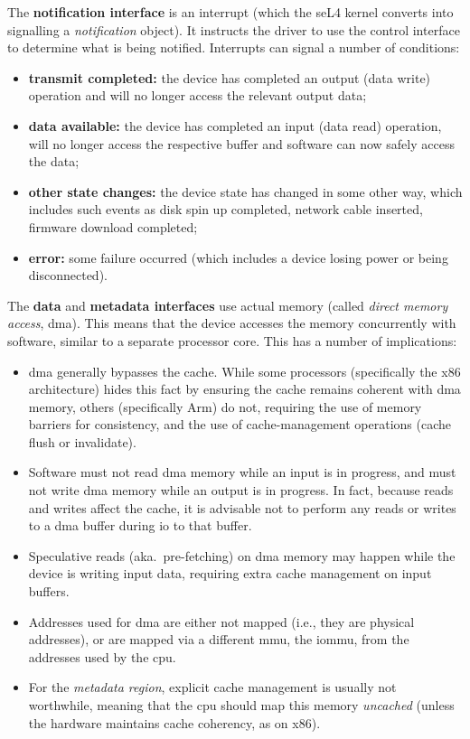 \documentclass[a4paper,12pt]{report}
\newcommand{\Obj}[1]{\textsl{#1}}
\begin{document}
The \textbf{notification interface} is an interrupt (which the seL4 kernel
converts into signalling a \Obj{notification} object). It instructs
the driver to use the control interface to determine
what is being notified. Interrupts can signal a number of conditions:
\begin{itemize}
\item \textbf{transmit completed:} the device has completed an output (data
  write) operation and will no longer access the relevant output data;
\item \textbf{data available:} the device has completed an input (data read)
  operation, will no longer access the respective buffer and software
  can now safely access the data;
\item \textbf{other state changes:} the device state has changed in
  some other way, which includes such events as disk spin up
  completed, network cable inserted, firmware download completed;
\item \textbf{error:} some failure occurred (which includes a device losing
  power or being disconnected).
\end{itemize}

The \textbf{data} and \textbf{metadata interfaces} use
actual memory (called \emph{direct memory access},
\gls{dma}). This means that the device accesses the memory concurrently with software, similar to a separate
processor core. This has a number of implications:
\begin{itemize}
\item \gls{dma} generally bypasses the cache. While some processors (specifically the
  x86 architecture) hides this fact by ensuring the cache remains
  coherent with \gls{dma} memory, others (specifically Arm) do not,
  requiring the use of memory barriers for consistency, and the use of
  cache-management operations (cache flush or invalidate).
\item Software must not read \gls{dma} memory while an input is in progress,
  and must not write \gls{dma} memory while an output is in progress.  In
  fact, because reads and writes affect the cache, it is advisable not
  to perform any reads or writes to a \gls{dma} buffer during \gls{io} to that
  buffer.
\item Speculative reads (aka.\ pre-fetching) on \gls{dma} memory may happen
  while the device is writing input data, requiring extra cache
  management on input buffers.
\item Addresses used for \gls{dma} are either not mapped (i.e., they are
  physical addresses), or are mapped via a different \gls{mmu}, the \gls{iommu},
  from the addresses used by the \gls{cpu}.
\item For the \Obj{metadata region}, explicit cache management is
  usually not worthwhile, meaning that the \gls{cpu} should map this memory
  \emph{uncached} (unless the hardware maintains cache coherency, as
  on x86).
\end{itemize}
\end{document}
